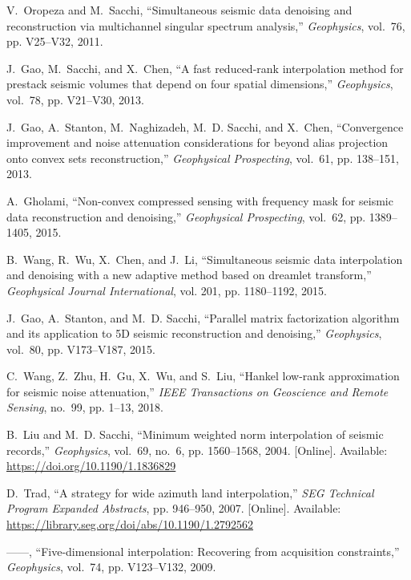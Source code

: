 \begin{thebibliography}{00}
V.~Oropeza and M.~Sacchi, ``Simultaneous seismic data denoising and
  reconstruction via multichannel singular spectrum analysis,''
  \emph{Geophysics}, vol.~76, pp. V25--V32, 2011.

J.~Gao, M.~Sacchi, and X.~Chen, ``A fast reduced-rank interpolation method for
  prestack seismic volumes that depend on four spatial dimensions,''
  \emph{Geophysics}, vol.~78, pp. V21--V30, 2013.

J.~Gao, A.~Stanton, M.~Naghizadeh, M.~D. Sacchi, and X.~Chen, ``Convergence
  improvement and noise attenuation considerations for beyond alias projection
  onto convex sets reconstruction,'' \emph{Geophysical Prospecting}, vol.~61,
  pp. 138--151, 2013.

A.~Gholami, ``Non-convex compressed sensing with frequency mask for seismic
  data reconstruction and denoising,'' \emph{Geophysical Prospecting}, vol.~62,
  pp. 1389--1405, 2015.

B.~Wang, R.~Wu, X.~Chen, and J.~Li, ``Simultaneous seismic data interpolation
  and denoising with a new adaptive method based on dreamlet transform,''
  \emph{Geophysical Journal International}, vol. 201, pp. 1180--1192, 2015.

J.~Gao, A.~Stanton, and M.~D. Sacchi, ``Parallel matrix factorization algorithm
  and its application to 5{D} seismic reconstruction and denoising,''
  \emph{Geophysics}, vol.~80, pp. V173--V187, 2015.

C.~Wang, Z.~Zhu, H.~Gu, X.~Wu, and S.~Liu, ``Hankel low-rank approximation for
  seismic noise attenuation,'' \emph{IEEE Transactions on Geoscience and Remote
  Sensing}, no.~99, pp. 1--13, 2018.

B.~Liu and M.~D. Sacchi, ``Minimum weighted norm interpolation of seismic
  records,'' \emph{Geophysics}, vol.~69, no.~6, pp. 1560--1568, 2004. [Online].
  Available: \url{https://doi.org/10.1190/1.1836829}


D.~Trad, ``A strategy for wide azimuth land interpolation,'' \emph{SEG
  Technical Program Expanded Abstracts}, pp. 946--950, 2007. [Online].
  Available: \url{https://library.seg.org/doi/abs/10.1190/1.2792562}


------, ``Five-dimensional interpolation: Recovering from acquisition
  constraints,'' \emph{Geophysics}, vol.~74, pp. V123--V132, 2009.


\end{thebibliography}
